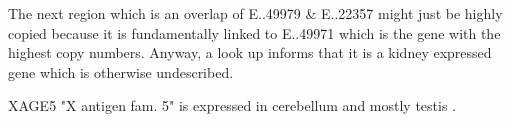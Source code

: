 The next region which is an overlap of E..49979 & E..22357 might just be highly copied because it is fundamentally linked to E..49971 which is the gene with the highest copy numbers. Anyway, a look up informs that it is a kidney expressed gene which is otherwise undescribed.

XAGE5 "X antigen fam. 5" is expressed in cerebellum and mostly testis \cite{bgee_}.




% 
% 
% 



